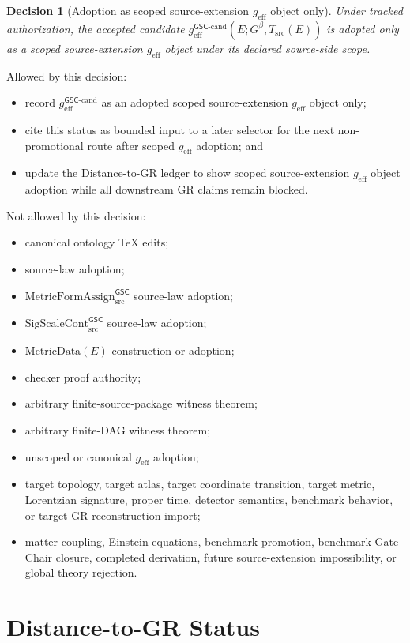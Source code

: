 \documentclass[11pt]{article}
\newcommand{\Gbeta}{G^\beta}
\newcommand{\SigScaleCont}{\mathrm{SigScaleCont}^{\mathsf{GSC}}_{\mathrm{src}}}
\newcommand{\MetricFormAssign}{\mathrm{MetricFormAssign}^{\mathsf{GSC}}_{\mathrm{src}}}
\newcommand{\geff}{g_{\mathrm{eff}}}
\newcommand{\geffCand}{g_{\mathrm{eff}}^{\mathsf{GSC}\mbox{-}\mathrm{cand}}}
\newtheorem{decision}{Decision}
\begin{document}
\begin{decision}[Adoption as scoped source-extension \(\geff\) object only]
Under tracked authorization, the accepted candidate
\(\geffCand(E;\Gbeta,T_{\mathrm{src}}(E))\) is adopted only as a scoped
source-extension \(\geff\) object under its declared source-side scope.
\end{decision}

Allowed by this decision:
\begin{itemize}[leftmargin=*]
  \item record \(\geffCand\) as an adopted scoped source-extension \(\geff\)
  object only;
  \item cite this status as bounded input to a later selector for the next
  non-promotional route after scoped \(\geff\) adoption; and
  \item update the Distance-to-GR ledger to show scoped source-extension
  \(\geff\) object adoption while all downstream GR claims remain blocked.
\end{itemize}

Not allowed by this decision:
\begin{itemize}[leftmargin=*]
  \item canonical ontology TeX edits;
  \item source-law adoption;
  \item \(\MetricFormAssign\) source-law adoption;
  \item \(\SigScaleCont\) source-law adoption;
  \item \(\mathrm{MetricData}(E)\) construction or adoption;
  \item checker proof authority;
  \item arbitrary finite-source-package witness theorem;
  \item arbitrary finite-DAG witness theorem;
  \item unscoped or canonical \(\geff\) adoption;
  \item target topology, target atlas, target coordinate transition, target
  metric, Lorentzian signature, proper time, detector semantics, benchmark
  behavior, or target-GR reconstruction import;
  \item matter coupling, Einstein equations, benchmark promotion, benchmark
  Gate Chair closure, completed derivation, future source-extension
  impossibility, or global theory rejection.
\end{itemize}

\section{Distance-to-GR Status}
\end{document}
